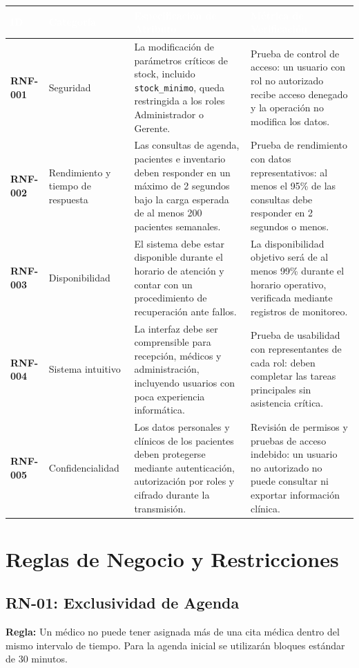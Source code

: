 \small
\begin{longtable}{>{\bfseries}p{}p{}p{}p{}}
\toprule
\rowcolor{azulprincipal}\textcolor{white}{ID} & \textcolor{white}{Categoría} & \textcolor{white}{Especificación de Atributo} & \textcolor{white}{Métrica de Verificación}\\
\midrule
RNF-001 & Seguridad & La modificación de parámetros críticos de stock, incluido \texttt{stock\_minimo}, queda restringida a los roles Administrador o Gerente. & Prueba de control de acceso: un usuario con rol no autorizado recibe acceso denegado y la operación no modifica los datos.\\
RNF-002 & Rendimiento y tiempo de respuesta & Las consultas de agenda, pacientes e inventario deben responder en un máximo de 2 segundos bajo la carga esperada de al menos 200 pacientes semanales. & Prueba de rendimiento con datos representativos: al menos el 95\% de las consultas debe responder en 2 segundos o menos.\\
RNF-003 & Disponibilidad & El sistema debe estar disponible durante el horario de atención y contar con un procedimiento de recuperación ante fallos. & La disponibilidad objetivo será de al menos 99\% durante el horario operativo, verificada mediante registros de monitoreo.\\
RNF-004 & Sistema intuitivo & La interfaz debe ser comprensible para recepción, médicos y administración, incluyendo usuarios con poca experiencia informática. & Prueba de usabilidad con representantes de cada rol: deben completar las tareas principales sin asistencia crítica.\\
RNF-005 & Confidencialidad & Los datos personales y clínicos de los pacientes deben protegerse mediante autenticación, autorización por roles y cifrado durante la transmisión. & Revisión de permisos y pruebas de acceso indebido: un usuario no autorizado no puede consultar ni exportar información clínica.\\
\bottomrule
\end{longtable}
\normalsize

\section{Reglas de Negocio y Restricciones}

\subsection*{RN-01: Exclusividad de Agenda}
\textbf{Regla:} Un médico no puede tener asignada más de una cita médica dentro del mismo intervalo de tiempo. Para la agenda inicial se utilizarán bloques estándar de 30 minutos.

